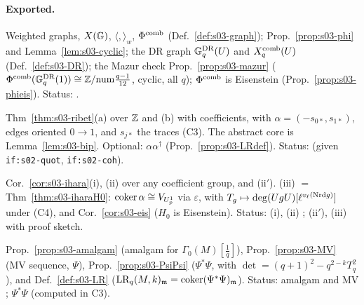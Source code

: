 \paragraph{Exported.}
\begin{interface}\label{if:s03-graph}
Weighted graphs, $X(\mathbb{G})$, $\langle,\rangle_w$, $\Phi^{\mathrm{comb}}$ (Def.~\ref{def:s03-graph}); Prop.~\ref{prop:s03-phi} and
Lemma~\ref{lem:s03-cyclic}; the DR graph $\mathbb{G}^{\mathrm{DR}}_q(U)$ and $X^{\mathrm{comb}}_q(U)$ (Def.~\ref{def:s03-DR}); the Mazur check
Prop.~\ref{prop:s03-mazur} ($\Phi^{\mathrm{comb}}(\mathbb{G}^{\mathrm{DR}}_q(1))\cong\mathbb{Z}/\mathrm{num}\frac{q-1}{12}$, cyclic, all $q$); $\Phi^{\mathrm{comb}}$ is Eisenstein
(Prop.~\ref{prop:s03-phieis}). Status: \stpmc.
\end{interface}
\begin{interface}\label{if:s03-ribet}
Thm~\ref{thm:s03-ribet}(a) over $\mathbb{Z}$ and (b) with coefficients, with $\alpha=(-s_{0*},s_{1*})$, edges oriented $0\to1$, and $s_{j*}$
the traces (C3). The abstract core is Lemma~\ref{lem:s03-bip}. Optional: $\alpha\alpha^\dagger$ (Prop.~\ref{prop:s03-LRdef}). Status:
\stpmc{} (given \texttt{if:s02-quot}, \texttt{if:s02-coh}).
\end{interface}
\begin{interface}\label{if:s03-ihara}
Cor.~\ref{cor:s03-ihara}(i), (ii) over any coefficient group, and (ii$'$). (iii) $=$ Thm~\ref{thm:s03-iharaH0}: $\operatorname{coker}\alpha\cong
V_{U^1_p}$ via $\varepsilon$, with $T_g\mapsto\deg(UgU)[\ell^{v_\ell(\mathrm{Nrd} g)}]$ under (C4), and Cor.~\ref{cor:s03-eis} ($H_0$ is
Eisenstein). Status: (i), (ii) \stproved; (ii$'$), (iii) \sttoprove{} with proof sketch.
\end{interface}
\begin{interface}\label{if:s03-amalgam}
Prop.~\ref{prop:s03-amalgam} (amalgam for $\Gamma_0(M)[\frac1q]$), Prop.~\ref{prop:s03-MV} (MV sequence, $\Psi$),
Prop.~\ref{prop:s03-PsiPsi} ($\Psi^*\Psi$, with $\det=(q+1)^2-q^{2-k}T_q^2$), and Def.~\ref{def:s03-LR}
($\mathrm{LR}_q(M,k)_{\mathfrak{m}}=\operatorname{coker}(\Psi^*\Psi)_{\mathfrak{m}}$). Status: amalgam and MV \stpmc; $\Psi^*\Psi$ \sttoprove{} (computed in C3).
\end{interface}

